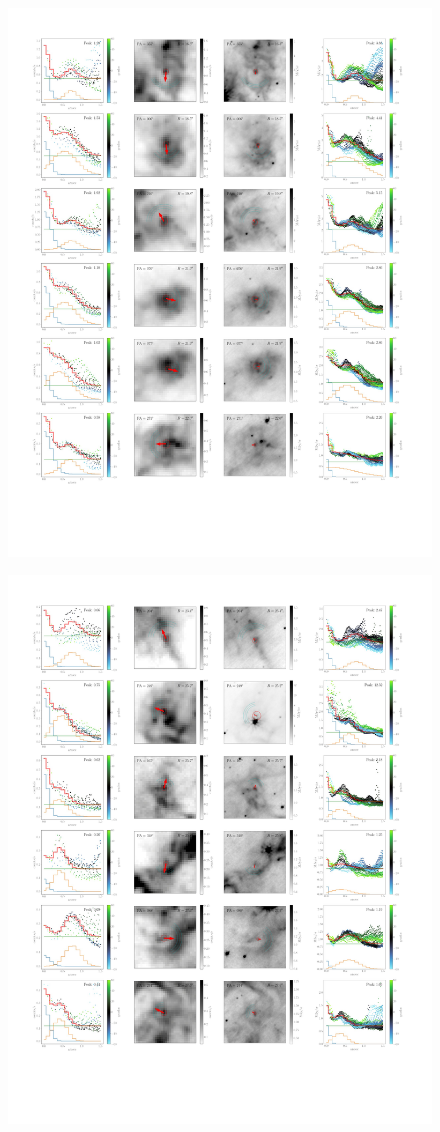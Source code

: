 \documentclass{book}
\begin{document}
\begin{figure}[h!]
    \centering
    \includegraphics[width=1.2\textwidth]{imagenes Chapter 4/ajustes_075324-3.pdf}
\end{figure}
\begin{figure}[h!]
    \centering
    \includegraphics[width=1.2\textwidth]{imagenes Chapter 4/ajustes_075324-4.pdf}
\end{figure}


\end{document}
